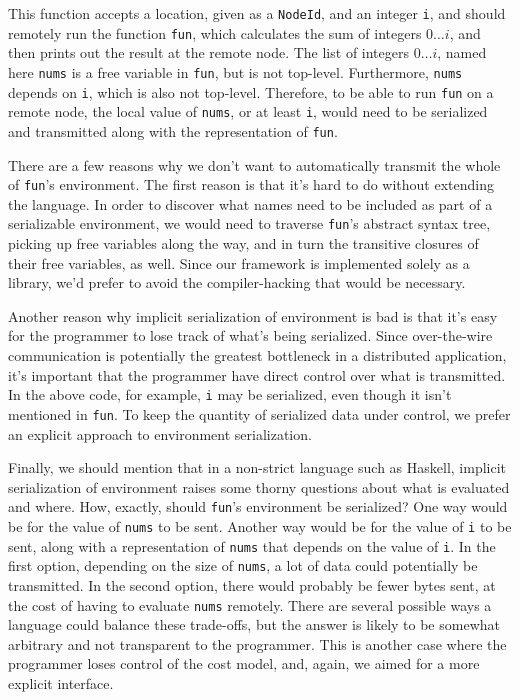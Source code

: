 \documentclass[preprint]{sigplanconf}
\begin{document}
This function accepts a location, given as a \texttt{NodeId}, and an integer \texttt{i}, and should remotely run the function \texttt{fun}, which calculates the sum of integers $0 \ldots i$, and then prints out the result at the remote node. The list of integers $0 \ldots i$, named here \texttt{nums} is a free variable in \texttt{fun}, but is not top-level. Furthermore, \texttt{nums} depends on \texttt{i}, which is also not top-level. Therefore, to be able to run \texttt{fun} on a remote node, the local value of \texttt{nums}, or at least \texttt{i}, would need to be serialized and transmitted along with the representation of \texttt{fun}.

There are a few reasons why we don't want to automatically transmit the whole of \texttt{fun}'s environment. The first reason is that it's hard to do without extending the language. In order to discover what names need to be included as part of a serializable environment, we would need to traverse \texttt{fun}'s abstract syntax tree, picking up free variables along the way, and in turn the transitive closures of their free variables, as well. Since our framework is implemented solely as a library, we'd prefer to avoid the compiler-hacking that would be necessary.

Another reason why implicit serialization of environment is bad is that it's easy for the programmer to lose track of what's being serialized. Since over-the-wire communication is potentially the greatest bottleneck in a distributed application, it's important that the programmer have direct control over what is transmitted. In the above code, for example, \texttt{i} may be serialized, even though it isn't mentioned in \texttt{fun}. To keep the quantity of serialized data under control, we prefer an explicit approach to environment serialization.

Finally, we should mention that in a non-strict language such as Haskell, implicit serialization of environment raises some thorny questions about what is evaluated and where. How, exactly, should \texttt{fun}'s environment be serialized? One way would be for the value of \texttt{nums} to be sent. Another way would be for the value of \texttt{i} to be sent, along with a representation of \texttt{nums} that depends on the value of \texttt{i}. In the first option, depending on the size of \texttt{nums}, a lot of data could potentially be transmitted. In the second option, there would probably be fewer bytes sent, at the cost of having to evaluate \texttt{nums} remotely. There are several possible ways a language could balance these trade-offs, but the answer is likely to be somewhat arbitrary and not transparent to the programmer. This is another case where the programmer loses control of the cost model, and, again, we aimed for a more explicit interface.
\end{document}
